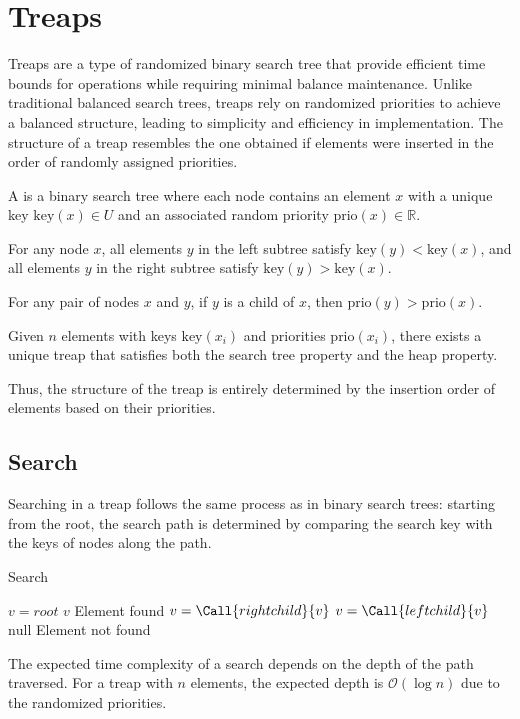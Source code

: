 \section{Treaps}

Treaps are a type of randomized binary search tree that provide efficient time bounds for operations while requiring minimal balance maintenance.
Unlike traditional balanced search trees, treaps rely on randomized priorities to achieve a balanced structure, leading to simplicity and efficiency in implementation.
The structure of a treap resembles the one obtained if elements were inserted in the order of randomly assigned priorities.
\begin{definition}
    A is a binary search tree where each node contains an element $x$ with a unique key $\text{key}(x) \in U$ and an associated random priority $\text{prio}(x) \in \mathbb{R}$.
\end{definition}
\begin{property}
    For any node $x$, all elements $y$ in the left subtree satisfy $\text{key}(y) < \text{key}(x)$, and all elements $y$ in the right subtree satisfy $\text{key}(y) > \text{key}(x)$.
\end{property}
\begin{property}[Heap]
    For any pair of nodes $x$ and $y$, if $y$ is a child of $x$, then $\text{prio}(y) > \text{prio}(x)$.
\end{property}
\begin{lemma}
    Given $n$ elements with keys $\text{key}(x_i)$ and priorities $\text{prio}(x_i)$, there exists a unique treap that satisfies both the search tree property and the heap property.
\end{lemma}
Thus, the structure of the treap is entirely determined by the insertion order of elements based on their priorities.

\subsection{Search}
Searching in a treap follows the same process as in binary search trees: starting from the root, the search path is determined by comparing the search key with the keys of nodes along the path.
\begin{algorithm}[H]
    \caption{Search}
    \begin{algorithmic}[1]
        \State $v = root$
                \State \Return $v$ \Comment Element found
            \EndIf
                \State $v = \Call{rightchild}{v}$
            \EndIf
                \State $v = \Call{leftchild}{v}$
            \EndIf
        \EndWhile
        \State \Return $\text{null}$ \Comment Element not found
    \end{algorithmic}
\end{algorithm}
The expected time complexity of a search depends on the depth of the path traversed. 
For a treap with $n$ elements, the expected depth is $\mathcal{O}(\log n)$ due to the randomized priorities.

